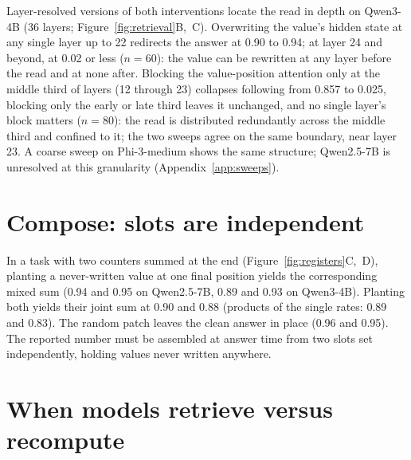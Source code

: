 \documentclass{article}
\begin{document}
Layer-resolved versions of both interventions locate the read in depth on Qwen3-4B (36 layers; Figure~\ref{fig:retrieval}B,~C). Overwriting the value's hidden state at any single layer up to 22 redirects the answer at 0.90 to 0.94; at layer 24 and beyond, at 0.02 or less ($n=60$): the value can be rewritten at any layer before the read and at none after. Blocking the value-position attention only at the middle third of layers (12 through 23) collapses following from 0.857 to 0.025, blocking only the early or late third leaves it unchanged, and no single layer's block matters ($n=80$): the read is distributed redundantly across the middle third and confined to it; the two sweeps agree on the same boundary, near layer 23. A coarse sweep on Phi-3-medium shows the same structure; Qwen2.5-7B is unresolved at this granularity (Appendix~\ref{app:sweeps}).

\section{Compose: slots are independent}
\label{sec:compose}

In a task with two counters summed at the end (Figure~\ref{fig:registers}C,~D), planting a never-written value at one final position yields the corresponding mixed sum (0.94 and 0.95 on Qwen2.5-7B, 0.89 and 0.93 on Qwen3-4B). Planting both yields their joint sum at 0.90 and 0.88 (products of the single rates: 0.89 and 0.83). The random patch leaves the clean answer in place (0.96 and 0.95). The reported number must be assembled at answer time from two slots set independently, holding values never written anywhere.

\section{When models retrieve versus recompute}
\label{sec:check}
\end{document}
